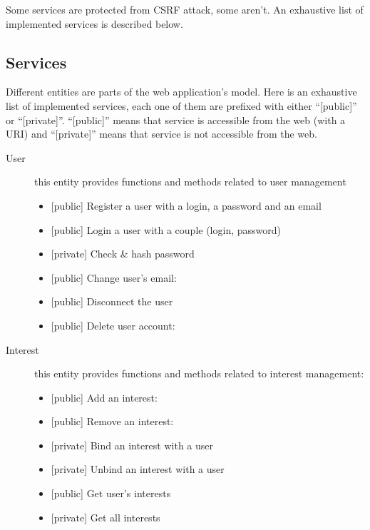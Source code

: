 \documentclass[a4paper,11pt,openany]{report}
\begin{document}
Some services are protected from CSRF attack, some aren't. An exhaustive list of implemented 
services is described below.

\subsection{Services}

Different entities are parts of the web application's model. Here is an exhaustive list of implemented 
services, each one of them are prefixed with either ``[public]'' or ``[private]''. ``[public]'' means that 
service is accessible from the web (with a URI) and ``[private]'' means that service is not accessible from 
the web.
\begin{description}
 \item[User] this entity provides functions and methods related to user management
 \begin{itemize}[label=--]
  \item {[}public{]} Register a user with a login, a password and an email
  \item {[}public{]} Login a user with a couple (login, password)
  \item {[}private{]} Check \& hash password
  \item {[}public{]} Change user's email: \color{red}{vulnerable to CSRF attack}\color{black}{}
  \item {[}public{]} Disconnect the user
  \item {[}public{]} Delete user account: \color{green}{protected against CSRF attack}\color{black}{}
 \end{itemize}
 
 \item[Interest] this entity provides functions and methods related to interest management:
 \begin{itemize}[label=--]
  \item {[}public{]} Add an interest: \color{green}{protected against CSRF attack}\color{black}{}
  \item {[}public{]} Remove an interest: \color{red}{vulnerable to CSRF attack}\color{black}{}
  \item {[}private{]} Bind an interest with a user
  \item {[}private{]} Unbind an interest with a user
  \item {[}public{]} Get user's interests
  \item {[}private{]} Get all interests
 \end{itemize}


\end{description}
\end{document}

